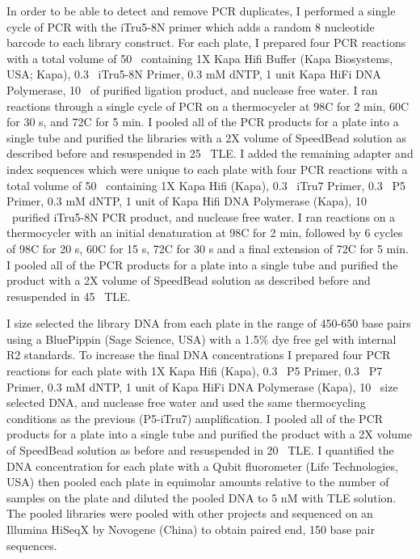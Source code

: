 In order to be able to detect and remove PCR duplicates, I performed a single   
cycle of PCR with the iTru5-8N primer which adds a random 8 nucleotide barcode to 
each library construct.  
For each plate, I prepared four PCR reactions with a total volume of 
50 \uL\ containing 1X Kapa Hifi Buffer (Kapa Biosystems, USA; Kapa),
0.3 \uM\ iTru5-8N Primer, 0.3 mM dNTP, 1 unit Kapa HiFi DNA Polymerase,
10 \uL\ of purified ligation product, and nuclease free water.
I ran reactions through a single cycle of PCR on a thermocycler at 98\degree C for 2 min, 
60\degree C for 30 s, and 72\degree C for 5 min. 
I pooled all of the PCR products for a plate into a single tube and purified the
libraries with a 2X volume of SpeedBead solution as described before and 
resuspended in 25 \uL\ TLE.
I added the remaining adapter and index sequences which were unique to each plate with four PCR
reactions with a total volume of 50 \uL\ containing 1X Kapa Hifi (Kapa),
0.3 \uM\ iTru7 Primer, 0.3 \uM\ P5 Primer, 0.3 mM dNTP, 1 unit of Kapa Hifi DNA Polymerase (Kapa),
10 \uL\ purified iTru5-8N PCR product, and nuclease free water.
I ran reactions on a thermocycler with an initial denaturation at 98\degree C for 2 min, 
followed by 6 cycles of 98\degree C for 20 s, 60\degree C for 15 s, 72\degree C 
for 30 s and a final extension of 72\degree C for 5 min.
I pooled all of the PCR products for a plate into a single tube and purified the
product with a 2X volume of SpeedBead solution as described before and 
resuspended in 45 \uL\ TLE.

I size selected the library DNA from each plate in the range of 450-650 base pairs using
a BluePippin (Sage Science, USA) with a 1.5\% dye free gel with internal R2 standards. 
To increase the final DNA concentrations I prepared four PCR reactions for each 
plate with 1X Kapa Hifi (Kapa), 0.3 \uM\ P5 Primer, 0.3 \uM\ P7 Primer, 0.3 mM dNTP, 
1 unit of Kapa HiFi DNA Polymerase (Kapa), 10 \uL\ size selected DNA, and 
nuclease free water and used the same thermocycling conditions as the previous
(P5-iTru7) amplification.
I pooled all of the PCR products for a plate into a single tube and purified 
the product with a 2X volume of SpeedBead solution as before and resuspended in 20 \uL\ TLE. 
I quantified the DNA concentration for each plate with a Qubit fluorometer 
(Life Technologies, USA) then pooled each plate in equimolar amounts relative 
to the number of samples on the plate and diluted the pooled DNA to 5 nM with
TLE solution. 
The pooled libraries were pooled with other projects and sequenced on an Illumina 
HiSeqX by Novogene (China) to obtain paired end, 150 base pair sequences. 


